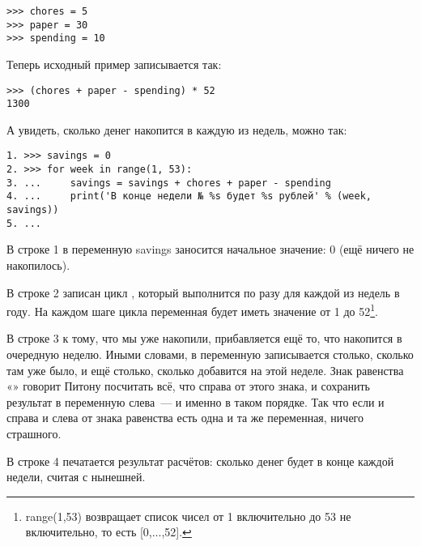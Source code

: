 \begin{listing}
\begin{verbatim}
>>> chores = 5
>>> paper = 30
>>> spending = 10
\end{verbatim}
\end{listing}

Теперь исходный пример записывается так:

\begin{listing}
\begin{verbatim}
>>> (chores + paper - spending) * 52
1300
\end{verbatim}
\end{listing}

А увидеть, сколько денег накопится в каждую из недель, можно так:

\begin{listing}
\begin{verbatim}
1. >>> savings = 0
2. >>> for week in range(1, 53):
3. ...     savings = savings + chores + paper - spending
4. ...     print('В конце недели № %s будет %s рублей' % (week, savings))
5. ...
\end{verbatim}
\end{listing}

В строке 1 в переменную savings заносится начальное значение: 0 (ещё ничего не накопилось).

В строке 2 записан цикл , который выполнится по разу для каждой из недель в году. На каждом шаге цикла переменная  будет иметь значение от 1 до 52\footnote{range(1,53) возвращает список чисел от 1 включительно до 53 не включительно, то есть [0,...,52].}.

В строке 3 к тому, что мы уже накопили, прибавляется ещё то, что накопится в очередную неделю. Иными словами, в переменную  записывается столько, сколько там уже было, и ещё столько, сколько добавится на этой неделе. Знак равенства «\code{=}» говорит Питону посчитать всё, что справа от этого знака, и сохранить результат в переменную слева — и именно в таком порядке. Так что если и справа и слева от знака равенства есть одна и та же переменная, ничего страшного.

В строке 4 печатается результат расчётов: сколько денег будет в конце каждой недели, считая с нынешней.

